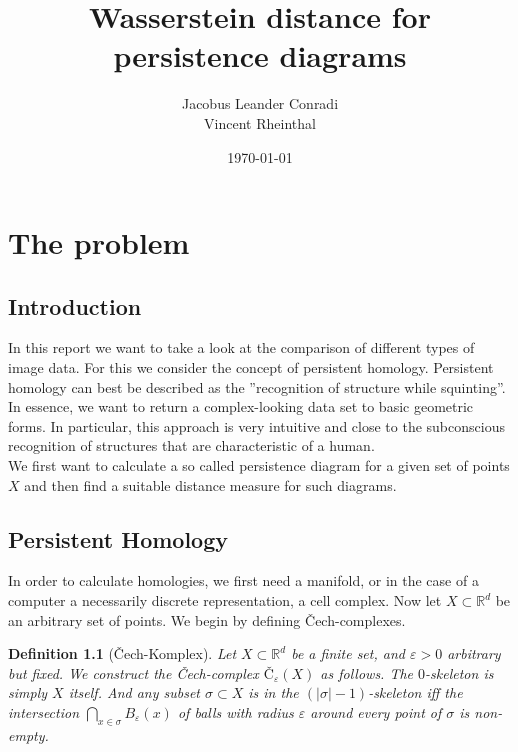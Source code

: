 \documentclass[11pt, a4paper,draft]{report}
\author{Jacobus Leander Conradi\\Vincent Rheinthal}
\date{\today}
\title{Wasserstein distance for persistence diagrams}
\newtheorem{definition}{Definition}
\newcommand{\bR}{\mathbb{R}}
\begin{document}
 
	\maketitle
	
	\thispagestyle{plain}
	\addtocounter{page}{-1}
	\tableofcontents 
	\vfil\null
	\clearpage
	\thispagestyle{empty}\mbox{}
	\clearpage
	
	\chapter{The problem}
	\section{Introduction}
	In this report we want to take a look at the comparison of different types of image data. For this we consider the concept of persistent homology. Persistent homology can best be described as the ''recognition of structure while squinting''. In essence, we want to return a complex-looking data set to basic geometric forms. In particular, this approach is very intuitive and close to the subconscious recognition of structures that are characteristic of a human.\\
	We first want to calculate a so called persistence diagram for a given set of points $X$ and then find a suitable distance measure for such diagrams.
	
	
	\section{Persistent Homology}
	
	In order to calculate homologies, we first need a manifold, or in the case of a computer a necessarily discrete representation, a cell complex. Now let $X\subset \bR^d$ be an arbitrary set of points. We begin by defining Čech-complexes.
	
	\begin{definition}[Čech-Komplex]
		Let $X\subset \bR^d$ be a finite set, and $\varepsilon>0$ arbitrary but fixed. We construct the Čech-complex $Č_\varepsilon(X)$ as follows. The $0$-skeleton is simply $X$ itself. And any subset $\sigma\subset X$ is in the $(|\sigma|-1)$-skeleton iff the intersection $\bigcap_{x\in\sigma}B_\varepsilon(x)$ of balls with radius $\varepsilon$ around every point of $\sigma$ is non-empty.
	\end{definition}
\end{document}
